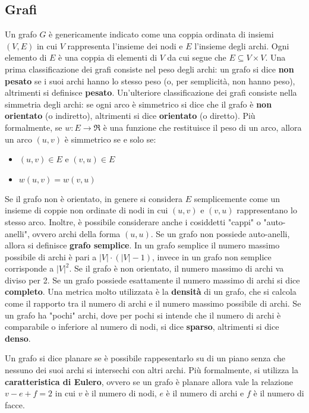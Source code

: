 \documentclass[a4paper]{article}
\begin{document}
	\subsection{Grafi}
	Un grafo $G$ è genericamente indicato come una coppia ordinata di insiemi $(V,E)$ in cui $V$ rappresenta l'insieme dei nodi e $E$ l'insieme degli archi. Ogni elemento di $E$ è una coppia di elementi di $V$ da cui segue che $E \subseteq V \times V$. Una prima classificazione dei grafi consiste nel peso degli archi: un grafo si dice \textbf{non pesato} se i suoi archi hanno lo stesso peso (o, per semplicità, non hanno peso), altrimenti si definisce \textbf{pesato}. Un'ulteriore classificazione dei grafi consiste nella simmetria degli archi: se ogni arco è simmetrico si dice che il grafo è \textbf{non orientato} (o indiretto), altrimenti si dice \textbf{orientato} (o diretto). Più formalmente, se $w:E \rightarrow \Re$ è una funzione che restituisce il peso di un arco, allora un arco $(u,v)$ è simmetrico se e solo se:
	\begin{itemize}
		\item $(u,v) \in E$ e $(v,u) \in E$
		\item $w(u,v) = w(v,u)$
	\end{itemize}
	Se il grafo non è orientato, in genere si considera $E$ semplicemente come un insieme di coppie non ordinate di nodi in cui $(u,v)$ e $(v,u)$ rappresentano lo stesso arco.
	Inoltre, è possibile considerare anche i cosiddetti "cappi" o "auto-anelli", ovvero archi della forma $(u,u)$. Se un grafo non possiede auto-anelli, allora si definisce \textbf{grafo semplice}. In un grafo semplice il numero massimo possibile di archi è pari a $|V|\cdot (|V|-1)$, invece in un grafo non semplice corrisponde a $|V|^2$. Se il grafo è non orientato, il numero massimo di archi va diviso per 2. Se un grafo possiede esattamente il numero massimo di archi si dice \textbf{completo}.
	Una metrica molto utilizzata è la \textbf{densità} di un grafo, che si calcola come il rapporto tra il numero di archi e il numero massimo possibile di archi. Se un grafo ha "pochi" archi, dove per pochi si intende che il numero di archi è comparabile o inferiore al numero di nodi, si dice \textbf{sparso}, altrimenti si dice \textbf{denso}.
	
	Un grafo si dice planare se è possibile rappesentarlo su di un piano senza che nessuno dei suoi archi si intersechi con altri archi. Più formalmente, si utilizza la \textbf{caratteristica di Eulero}, ovvero se un grafo è planare allora vale la relazione $v-e+f=2$ in cui $v$ è il numero di nodi, $e$ è il numero di archi e $f$ è il numero di facce.
	
\end{document}
